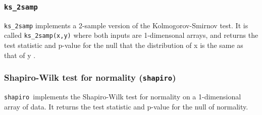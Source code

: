 \documentclass[KSmain.tex]{subfiles}
\begin{document}
\subsubsection*{\texttt{ks\_2samp}}
\texttt{ks\_2samp} implements a 2-sample version of the Kolmogorov-Smirnov test. It is called \texttt{ks\_2samp(x,y)}
where both inputs are 1-dimensonal arrays, and returns the test statistic and p-value for the null that
the distribution of x is the same as that of y .
\bigskip
\subsubsection*{Shapiro-Wilk test for normality (\texttt{shapiro})}
\texttt{shapiro }implements the Shapiro-Wilk test for normality on a 1-dimensional array of data. It returns the
test statistic and p-value for the null of normality.

\newpage
%
%
%
%	
%	
%	
%	
%	
%	
%	
%	
%	
%	
%	
%	
%	
%
\end{document}
